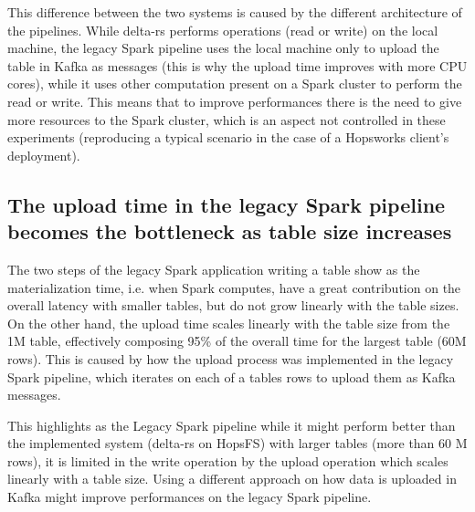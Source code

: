 This difference between the two systems is caused by the different architecture of the pipelines. While delta-rs performs operations (read or write) on the local machine, the legacy Spark pipeline uses the local machine only to upload the table in Kafka as messages (this is why the upload time improves with more \gls{CPU} cores), while it uses other computation present on a Spark cluster to perform the read or write. This means that to improve performances there is the need to give more resources to the Spark cluster, which is an aspect not controlled in these experiments (reproducing a typical scenario in the case of a Hopsworks client's deployment). 

\subsection{The upload time in the legacy Spark pipeline becomes the bottleneck as table size increases}

The two steps of the legacy Spark application writing a table show as the materialization time, i.e. when Spark computes, have a great contribution on the overall latency with smaller tables, but do not grow linearly with the table sizes. On the other hand, the upload time scales linearly with the table size from the 1M table, effectively composing 95\% of the overall time for the largest table (60M rows). This is caused by how the upload process was implemented in the legacy Spark pipeline, which iterates on each of a tables rows to upload them as Kafka messages. 

This highlights as the Legacy Spark pipeline while it might perform better than the implemented system (delta-rs on \gls{HopsFS}) with larger tables (more than 60 M rows), it is limited in the write operation by the upload operation which scales linearly with a table size. Using a different approach on how data is uploaded in Kafka might improve performances on the legacy Spark pipeline.